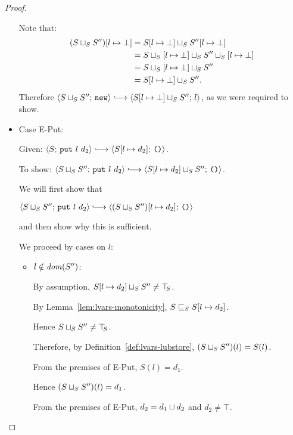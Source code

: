 \begin{proof}
\begin{itemize}
      Note that:
      \begin{align*}
        (S \sqcup_{S} S'')[l \mapsto \bot] &=
        S[l \mapsto \bot] \sqcup_{S} S''[l \mapsto \bot] \\ &=
        S \sqcup_{S} \left[ l \mapsto \bot \right] \sqcup_{S} S'' \sqcup_{S} \left[ l \mapsto \bot \right]
        \\ &=
        S \sqcup_{S} \left[ l \mapsto \bot \right] \sqcup_{S} S''
        \\ &= S[l \mapsto \bot] \sqcup_{S} S''.
      \end{align*}
      Therefore $\config{\lubstore{S}{S''}}{\NEW} \parstepsto
      \config{\lubstore{\extSRaw{S}{l}{\bot}}{S''}}{l}$, as we were
      required to show.

    \item Case {\sc E-Put}:

      Given: $\config{S}{\putexp{l}{d_2}} \parstepsto
      \config{\extSRaw{S}{l}{d_2}}{\unit}$.

      To show: $\config{\lubstore{S}{S''}}{\putexp{l}{d_2}}
      \parstepsto
      \config{\lubstore{\extSRaw{S}{l}{d_2}}{S''}}{\unit}$.

      We will first show that

      $\config{\lubstore{S}{S''}}{\putexp{l}{d_2}} \parstepsto
      \config{\extSRaw{(\lubstore{S}{S''})}{l}{d_2}}{\unit}$

      and then show why this is sufficient.

      We proceed by cases on $l$:

      \begin{itemize}
        \item $l \notin \mathit{dom}(S'')$:

          By assumption, $S[l \mapsto d_2] \sqcup_{S} S'' \neq
          \top\hspace{-0.85mm}_{S}$.

          By Lemma~\ref{lem:lvars-monotonicity},
          $S \sqsubseteq_S S[l \mapsto d_2]$.

          Hence $S \sqcup_{S} S'' \neq \top\hspace{-0.85mm}_{S}$.

          Therefore, by Definition~\ref{def:lvars-lubstore},
          $(S \sqcup_{S} S'')(l) = S(l)$.

          From the premises of {\sc E-Put}, $S(l) = d_1$.

          Hence $(S \sqcup_{S} S'')(l) = d_1$.

          From the premises of {\sc E-Put}, $d_2 = d_1 \sqcup d_2$
          and $d_2 \neq \top$.


\end{itemize}
\end{itemize}
\end{proof}
